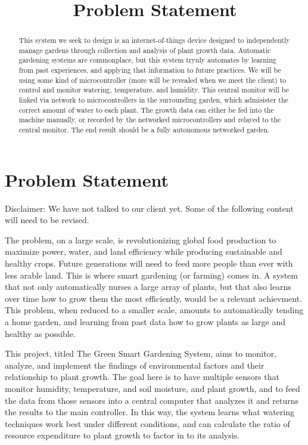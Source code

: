 \documentclass[letterpaper, 10pt, fleqn]{article}
\title{Problem Statement}
\begin{document}
\begin{abstract}
	This system we seek to design is an internet-of-things device designed to independently manage gardens through collection and analysis of plant growth data. Automatic gardening systems are commonplace, but this system tryuly automates by learning from past experiences, and applying that information to future practices. We will be using some kind of microcontroller (more will be revealed when we meet the client) to control and monitor watering, temperature, and humidity. This central monitor will be linked via network to microcontrollers in the surrounding garden, which admisister the correct amount of water to each plant. The growth data can either be fed into the machine manually, or recorded by the networked microcontrollers and relayed to the central monitor. The end result should be a fully autonomous networked garden. 
\end{abstract}

\section{Problem Statement}
	Disclaimer: We have not talked to our client yet. Some of the following content will need to be revised. 

	The problem, on a large scale, is revolutionizing global food production to maximize power, water, and land efficiency while producing sustainable and healthy crops. Future generations will need to feed more people than ever with less arable land. This is where smart gardening (or farming) comes in. A system that not only automatically nurses a large array of plants, but that also learns over time how to grow them the most efficiently, would be a relevant achievment. This problem, when reduced to a smaller scale, amounts to automatically tending a home garden, and learning from past data how to grow plants as large and healthy as possible.  

	This project, titled The Green Smart Gardening System, aims to monitor, analyze, and implement the findings of environmental factors and their relationship to plant growth. The goal here is to have multiple sensors that monitor humidity, temperature, and soil moisture, and plant growth, and to feed the data from those sensors into a central computer that analyzes it and returns the results to the main controller. In this way, the system learns what watering techniques work best under different conditions, and can calculate the ratio of resource expenditure to plant growth to factor in to its analysis.  
\end{document}
